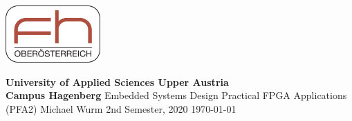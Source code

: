 \thispagestyle{empty} %
\hfill
\includegraphics[height=2.2cm]{./img/fhooe-logo}

\begin{center}
	\textbf{\Large }
	\linebreak
	\linebreak
	\horizontalLine{0.5 mm}
	\linebreak
	\linebreak
	\textbf{\huge \UebungNr}
	\linebreak
	\linebreak
	\linebreak
	\LARGE \UebungTopic
	\linebreak
	\linebreak
	\horizontalLine{0.5 mm}
	\linebreak
	\linebreak
	\linebreak
	\linebreak
	\linebreak
	\Large {\textbf{University of Applied Sciences Upper Austria\\
									Campus Hagenberg}}
	\linebreak
	\linebreak
	\Large { Embedded Systems Design }
	\linebreak
	\linebreak
	\Large { Practical FPGA Applications (PFA2) }
	\linebreak
	\linebreak
	\linebreak
	\linebreak
	\linebreak
	\linebreak
	\Large {Michael Wurm}
	\linebreak
	\linebreak
	\linebreak
	\linebreak
	\linebreak
	\linebreak
	\normalsize{ 2nd Semester, 2020 }
	\linebreak
	\linebreak
	\large{\today}

\end{center}
